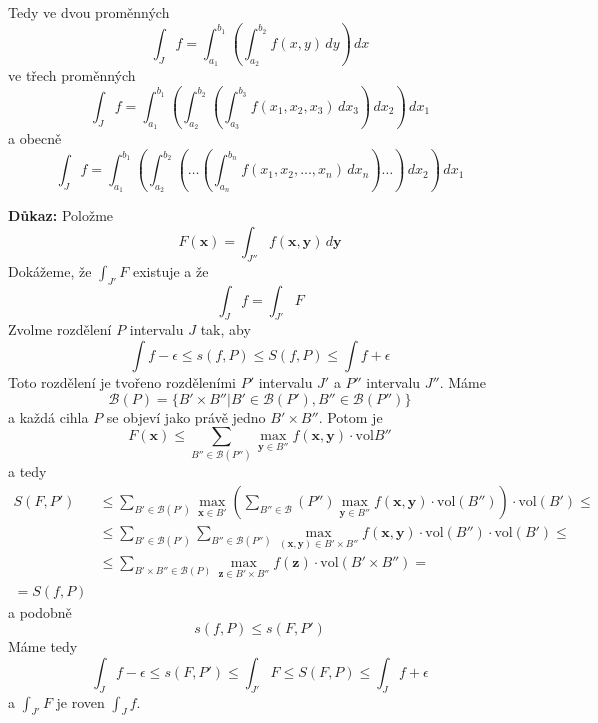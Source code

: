 \documentclass[../main.tex]{subfiles}
\begin{document}
\vspace{10mm}
\noindent
Tedy ve dvou proměnných
\[ \int_{J} f = \int_{a_1}^{b_1} \left( \int_{a_2}^{b_2} f(x,y) \,dy \right) \,dx \]
ve třech proměnných
\[ \int_{J} f =
\int_{a_1}^{b_1} \left(
\int_{a_2}^{b_2} \left(
\int_{a_3}^{b_3} f(x_1, x_2, x_3) \,dx_3 \right) \,dx_2 \right) \,dx_1 \]
a obecně
\[ \int_{J} f =
\int_{a_1}^{b_1} \left(
\int_{a_2}^{b_2} \left(
\dots \left(
\int_{a_n}^{b_n} f(x_1, x_2, ..., x_n) \,dx_n \right) \dots \right) \,dx_2 \right) \,dx_1 \]

\vspace{5mm}
\noindent
\textbf{Důkaz:}
Položme
\[ F(\mathbf{x}) = \int_{J''} f(\mathbf{x}, \mathbf{y}) \,d\mathbf{y} \]
Dokážeme, že $\int_{J'} F$ existuje a že
\[ \int_{J} f = \int_{J'} F \]
Zvolme rozdělení $P$ intervalu $J$ tak, aby
\[ \int f - \epsilon \leq s(f,P) \leq S(f,P) \leq \int f + \epsilon \]
Toto rozdělení je tvořeno rozděleními $P'$ intervalu $J'$ a $P''$ intervalu $J''$. Máme
\[ \mathcal{B}(P) = \{ B' \times B'' | B' \in \mathcal{B}(P'), B'' \in \mathcal{B}(P'') \} \]
a každá cihla $P$ se objeví jako právě jedno $B' \times B''$. Potom je
\[ F(\mathbf{x}) \leq \sum_{B''\in \mathcal{B}(P'')}
\max_{\mathbf{y} \in B''} f(\mathbf{x}, \mathbf{y}) \cdot \textrm{vol}B'' \]
a tedy
\begin{align*}
    S(F, P')
    &\leq \sum_{B' \in \mathcal{B}(P')} \max_{\mathbf{x}\in B'}
    \left( \sum_{B'' \in \mathcal{B}}(P'') \max_{\mathbf{y}\in B''}
    f(\mathbf{x}, \mathbf{y}) \cdot \textrm{vol}(B'')\right) \cdot \textrm{vol}(B') \leq\\
    &\leq \sum_{B' \in \mathcal{B}(P')} \sum_{B'' \in \mathcal{B}(P'')}
    \max_{(\mathbf{x}, \mathbf{y}) \in B' \times B''} f(\mathbf{x}, \mathbf{y})
    \cdot \textrm{vol}(B'') \cdot \textrm{vol}(B') \leq\\
    &\leq \sum_{B' \times B'' \in \mathcal{B}(P)} \max_{\mathbf{z}\in B' \times B''}
    f(\mathbf{z}) \cdot \textrm{vol}(B' \times B'') =\\
    = S(f,P)
\end{align*}
a podobně
\[ s(f,P) \leq s(F,P') \]
Máme tedy
\[ \int_{J} f - \epsilon \leq s(F,P') \leq \int_{J'} F \leq S(F,P) \leq \int_{J} f + \epsilon \]
a $\int_{J'} F$ je roven $\int_{J} f$.

\end{document}
